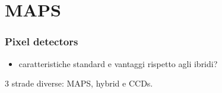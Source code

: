 \section{MAPS}

    \begin{frame}
        \frametitle{Pixel detectors}
        \begin{itemize}
            \item caratteristiche standard e vantaggi rispetto agli ibridi?
        \end{itemize}
        3 strade diverse: MAPS, hybrid e CCDs.
    \end{frame} 





